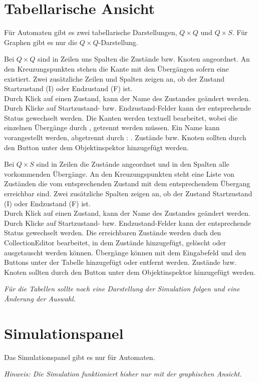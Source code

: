 \section{Tabellarische Ansicht}
Für Automaten gibt es zwei tabellarische Darstellungen, $Q \times Q$ und $Q \times S$. Für Graphen gibt es nur die $Q \times Q$-Darstellung.

Bei $Q \times Q$ sind in Zeilen uns Spalten die Zustände bzw. Knoten angeordnet. An den Kreuzungspunkten stehen die Kante mit den Übergängen sofern eine existiert. Zwei zusätzliche Zeilen und Spalten zeigen an, ob der Zustand Startzustand (I) oder Endzustand (F) ist.\\
Durch Klick auf einen Zustand, kann der Name des Zustandes geändert werden. Durch Klicke auf Startzustand- bzw. Endzustand-Felder kann der entsprechende Status gewechselt werden. Die Kanten werden textuell bearbeitet, wobei die einzelnen Übergänge durch \glqq , \grqq getrennt werden müssen. Ein Name kann vorangestellt werden, abgetrennt durch \glqq : \grqq . Zustände bzw. Knoten sollten durch den Button unter dem Objektinspektor hinzugefügt werden.

Bei $Q \times S$ sind in Zeilen die Zustände angeordnet und in den Spalten alle vorkommenden Übergänge. An den Kreuzungspunkten steht eine Liste von Zuständen die vom entsprechenden Zustand mit dem entsprechendem Übergang erreichbar sind. Zwei zusätzliche Spalten zeigen an, ob der Zustand Startzustand (I) oder Endzustand (F) ist.\\
Durch Klick auf einen Zustand, kann der Name des Zustandes geändert werden. Durch Klicke auf Startzustand- bzw. Endzustand-Felder kann der entsprechende Status gewechselt werden. Die erreichbaren Zustände werden duch den Collection\-Editor bearbeitet, in dem Zustände hinzugefügt, gelöscht oder ausgetauscht werden können. Übergänge können mit dem Eingabefeld und den Buttons unter der Tabelle hinzugefügt oder entfernt werden. Zustände bzw. Knoten sollten durch den Button unter dem Objektinspektor hinzugefügt werden.

\textit{Für die Tabellen sollte noch eine Darstellung der Simulation folgen und eine Änderung der Auswahl.}
\section{Simulationspanel}
Das Simulationspanel gibt es nur für Automaten.

\textit{Hinweis: Die Simulation funktioniert bisher nur mit der graphischen Ansicht.}

